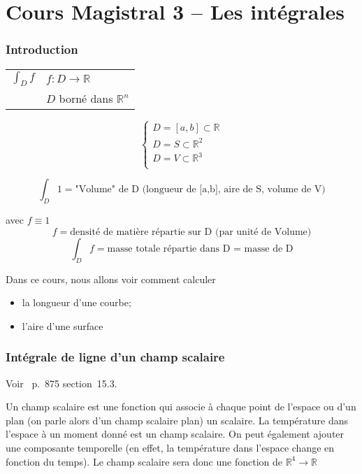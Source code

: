 \part{Cours Magistral 3 -- Les intégrales}
\section{Introduction}

\begin{center}
\begin{tabular}{l l}

$\int_D f$ &  $f: D\to \mathbb{R}$ \\
&$D$ borné dans $\mathbb{R}^n$
\end{tabular}

\end{center}


\[
\left\{
\begin{array}{l}
D=[a,b]\subset\mathbb{R}\\
D=S\subset\mathbb{R}^2\\
D=V\subset\mathbb{R}^3\\
\end{array}
\right.
\]



\[\int_D 1 = \text{"Volume" de D (longueur de [a,b], aire de S, volume de V)}\]

avec $f\equiv1$
\[ f=\text{densité de matière répartie sur D (par unité de Volume)} \]
\[\int_D f = \text{masse totale répartie dans D = masse de D}\]

Dans ce cours, nous allons voir comment calculer
\begin{itemize}
\item la longueur d'une courbe;
\item l'aire d'une surface
\end{itemize}

\section{Intégrale de ligne d'un champ scalaire}

Voir~\cite{adams2013calculus} p.~875 section~15.3.

Un champ scalaire est une fonction qui associe à chaque point de l'espace ou d'un plan (on parle alors d'un champ scalaire plan) un scalaire. La température dans l'espace à un moment donné est un champ scalaire. On peut également ajouter une composante temporelle (en effet, la température dans l'espace change en fonction du temps). Le champ scalaire sera donc une fonction de $\mathbb{R}^4 \to \mathbb{R} $

